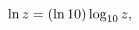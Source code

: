 \[\mathop{\ln\/}\nolimits z=(\mathop{\ln\/}\nolimits 10)\mathop{\mathrm{log}_{10%
}\/}\nolimits z,\]